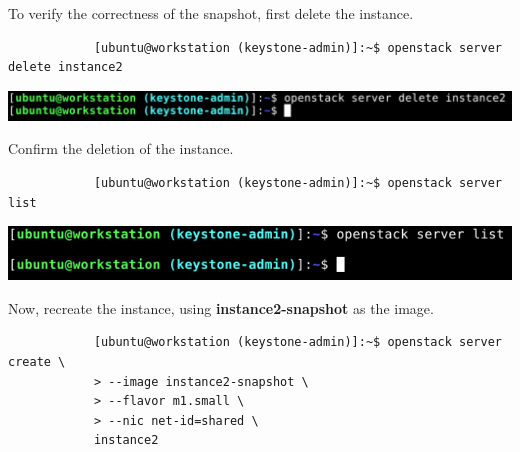 \documentclass[letterpaper, 12pt]{article}
\begin{document}
\begin{enumerate}
    \begin{labstep}
        To verify the correctness of the snapshot, first delete the instance.
        \begin{lstlisting}
            [ubuntu@workstation (keystone-admin)]:~$ openstack server delete instance2
        \end{lstlisting}

        \begin{center}
            \includegraphics[width=\linewidth]{images/part2/step12.png}
        \end{center}
    \end{labstep}

    \begin{labstep}
        Confirm the deletion of the instance.
        \begin{lstlisting}
            [ubuntu@workstation (keystone-admin)]:~$ openstack server list
        \end{lstlisting}

        \begin{center}
            \includegraphics[width=\linewidth]{images/part2/step13.png}
        \end{center}
    \end{labstep}

    \begin{labstep}
        Now, recreate the instance, using \textbf{instance2-snapshot} as the image.
        \begin{lstlisting}
            [ubuntu@workstation (keystone-admin)]:~$ openstack server create \
            > --image instance2-snapshot \
            > --flavor m1.small \
            > --nic net-id=shared \
            instance2
        \end{lstlisting}


\end{labstep}
\end{enumerate}
\end{document}
